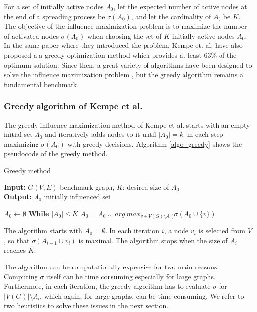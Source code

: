 \documentclass[pdflatex,sn-mathphys-ay]{sn-jnl}
\begin{document}
For a set of initially active nodes $A_0$, let the expected number of active nodes at the end of a spreading process be $\sigma(A_0)$, and let the cardinality of $A_0$ be $K$. The objective of the influence maximization problem is to maximize the number of activated nodes $\sigma(A_0)$ when choosing the set of $K$ initially active nodes $A_0$. In the same paper where they introduced the problem, Kempe et. al. have also proposed a a greedy optimization method which provides at least 63\% of the optimum solution. Since then, a great variety of algorithms have been designed to solve the influence maximization problem \citep{lisurvey}, but the greedy algorithm remains a fundamental benchmark.



\subsubsection{Greedy algorithm of Kempe et al.}\label{subsec_greedy}

The greedy influence maximization method of Kempe et al. \citep{kempe} starts with an empty initial set $A_0$ and iteratively adds nodes to it until $|A_0| = k$, in each step maximizing $\sigma(A_0)$ with greedy decisions. Algorithm \ref{algo_greedy} shows the pseudocode of the greedy method.

\begin{algorithm}[ht]
\caption{Greedy method}
\label{algo_greedy}
\textbf{Input:} $G(V,E)$ benchmark graph, $K$: desired size of $A_0$
\\
\textbf{Output:} $A_{0}$ initially influenced set
\begin{algorithmic}[1]
    \State $A_0 \leftarrow \emptyset$
    \State \textbf{While} $|A_{0}| \leq K$
    \State \hspace{\algorithmicindent} $A_{0}=A_{0} \cup \ arg \ max_{v \in V(G) \setminus A_{0})} \sigma(A_{0} \cup \{v\})$
\end{algorithmic}
\end{algorithm}

The algorithm starts with $A_0 = \emptyset$. In each iteration $i$, a node $v_i$ is selected from $V$, so that $\sigma(A_{i-1} \cup {v_i})$ is maximal. The algorithm stops when the size of $A_i$ reaches $K$.

The algorithm can be computationally expensive for two main reasons. Computing $\sigma$ itself can be time consuming especially for large graphs. Furthermore, in each iteration, the greedy algorithm has to evaluate $\sigma$ for $|V(G)| \setminus A_i$, which again, for large graphs, can be time consuming. We refer to two heuristics to solve these issues in the next section.
\end{document}
